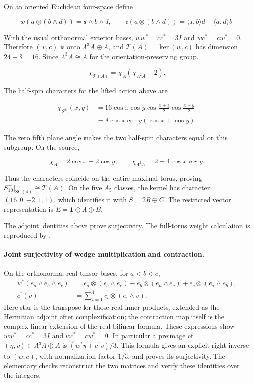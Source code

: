 \documentclass[11pt,a4paper]{article}
\begin{document}
On an oriented Euclidean four-space define

\[
w(a\otimes(b\wedge d))=a\wedge b\wedge d,\qquad
c(a\otimes(b\wedge d))=\langle a,b\rangle d-\langle a,d\rangle b.
\]

With the usual orthonormal exterior bases, \(ww^*=cc^*=3I\) and \(wc^*=cw^*=0\). Therefore \((w,c)\) is onto \(\Lambda^3A\oplus A\), and \(\mathcal T(A)=\ker(w,c)\) has dimension \(24-8=16\). Since \(\Lambda^3A\cong A\) for the orientation-preserving group,

\[
\chi_{\mathcal T(A)}=\chi_A(\chi_{\Lambda^2A}-2).
\]

The half-spin characters for the lifted action above are

\[
\begin{aligned}
\chi_{S_{10}^{\pm}}(x,y)
&=16\cos x\cos y\cos\frac{x+y}{2}\cos\frac{x-y}{2}\\
&=8\cos x\cos y(\cos x+\cos y).
\end{aligned}
\]

The zero fifth plane angle makes the two half-spin characters equal on this subgroup. On the source,

\[
\chi_A=2\cos x+2\cos y,\qquad
\chi_{\Lambda^2A}=2+4\cos x\cos y.
\]

Thus the characters coincide on the entire maximal torus, proving \(S_{10}^{\pm}|_{\mathrm{SO}(4)}\cong\mathcal T(A)\). On the five \(A_5\) classes, the kernel has character \((16,0,-2,1,1)\), which identifies it with \(S=2B\oplus C\). The restricted vector representation is \(E=\mathbf1\oplus A\oplus B\).

The adjoint identities above prove surjectivity. The full-torus weight calculation is reproduced by .

\paragraph{Joint surjectivity of wedge multiplication and contraction.}
On the orthonormal real tensor bases, for \(a<b<c\),
\[
\begin{aligned}
w^*(e_a\wedge e_b\wedge e_c)
&=e_a\otimes(e_b\wedge e_c)-e_b\otimes(e_a\wedge e_c)
   +e_c\otimes(e_a\wedge e_b),\\
c^*(v)&=\sum_{i=1}^4e_i\otimes(e_i\wedge v).
\end{aligned}
\]
Here star is the transpose for those real inner products, extended as the Hermitian adjoint after complexification; the contraction map itself is the complex-linear extension of the real bilinear formula. These expressions show \(ww^*=cc^*=3I\) and \(wc^*=cw^*=0\). In particular a preimage of \((\eta,v)\in\Lambda^3A\oplus A\) is \((w^*\eta+c^*v)/3\). This formula gives an explicit right inverse to \((w,c)\), with normalization factor \(1/3\), and proves its surjectivity. The elementary checks reconstruct the two matrices and verify these identities over the integers.
\end{document}

